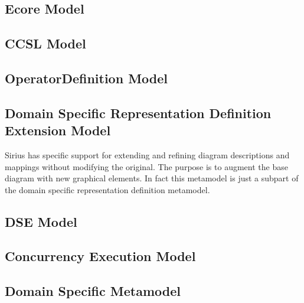\documentclass{gemoc} %
\begin{document}

\subsection{Ecore Model}


\subsection{CCSL Model}


\subsection{OperatorDefinition Model}


\subsection{Domain Specific Representation Definition Extension Model}
Sirius has specific support for extending and refining diagram descriptions and mappings without modifying the original. The purpose is to augment the base diagram with new graphical elements. In fact this metamodel is just a subpart of the domain specific representation definition metamodel.

\subsection{DSE Model}


\subsection{Concurrency Execution Model}


\subsection{Domain Specific Metamodel}
\end{document}
